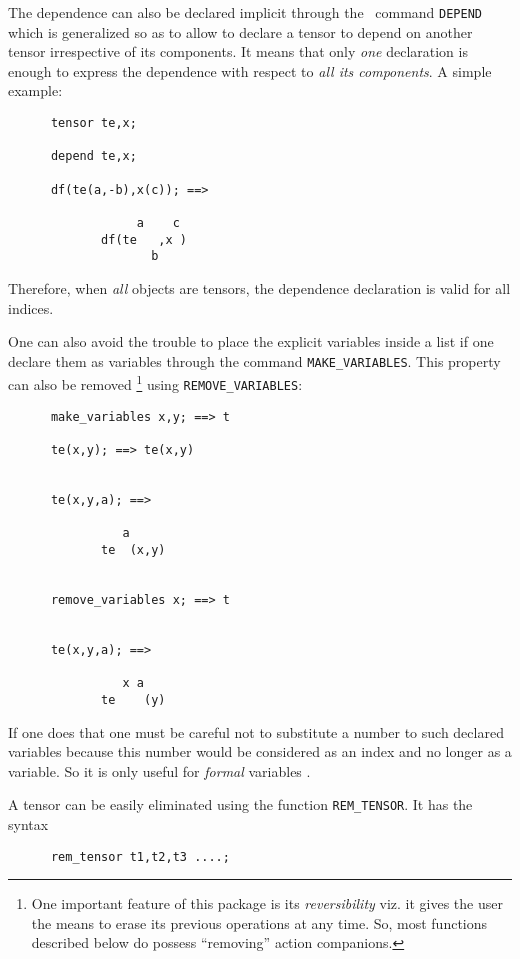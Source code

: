 The dependence can also be declared implicit through the \REDUCE\ command 
\texttt{DEPEND}
which is generalized so as to allow to declare a tensor 
to depend on another tensor irrespective of its components. It means that only \emph{one}
declaration is enough to express the dependence with respect to 
\emph{all its components}.
A simple example:
\begin{verbatim}
      tensor te,x;

      depend te,x;

      df(te(a,-b),x(c)); ==>

                  a    c
             df(te   ,x )
                    b
\end{verbatim}
Therefore, when \emph{all} objects are tensors, the dependence declaration 
is valid for all indices. 

One can also avoid the trouble to place the explicit variables inside a list if
one declare them as variables through the command 
\texttt{MAKE\_VARIABLES}.
This property can also be removed%
\footnote{One important feature of this package is its \emph{reversibility}
viz. it gives the user the means to erase its previous operations 
at any time. So, most functions described below do
possess ``removing'' action companions.} using 
\texttt{REMOVE\_VARIABLES}:
\begin{verbatim}
      make_variables x,y; ==> t

      te(x,y); ==> te(x,y)


      te(x,y,a); ==> 

                a
             te  (x,y)


      remove_variables x; ==> t


      te(x,y,a); ==>

                x a
             te    (y)
\end{verbatim}
If one does that one must be careful not to substitute a number to such 
declared variables because this number would be considered as an index and 
no longer as a variable. So it is only useful for \emph{formal} variables%
.

A tensor can be easily eliminated using the function 
\texttt{REM\_TENSOR}. It has the syntax
\begin{verbatim}
      rem_tensor t1,t2,t3 ....;
\end{verbatim}

